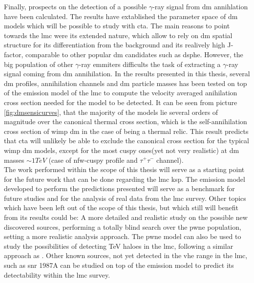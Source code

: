 \documentclass[main.tex]{subfiles}
\begin{document}
Finally, prospects on the detection of a possible $\gamma$-ray signal from \gls{dm} annihlation have been calculated. The results have extablished the parameter space of \gls{dm} models which will be possible to study with \gls{cta}. The main reasons to point towards the \gls{lmc} were its extended nature, which allow to rely on \gls{dm} spatial structure for its differentiation from the background and its realively high J-factor, comparable to other popular \gls{dm} candidates such as \gls{dsphe}. However, the big population of other $\gamma$-ray emmiters difficults the task of extracting a $\gamma$-ray signal coming from \gls{dm} annihilation. In the results presented in this thesis, several \gls{dm} profiles, annihilation channels and \gls{dm} particle masses has been tested on top of the emission model of the \gls{lmc} to compute the velocity averaged anihilation cross section needed for the model to be detected. It can be seen from picture \ref{fig:dmsensicurves}, that the majority of the models lie several orders of magnitude over the canonical thermal cross section, which is the self-annihilation cross section of \gls{wimp} \gls{dm} in the case of being a thermal relic. This result predicts that \gls{cta} will unlikely be able to exclude the canonical cross section for the typical \gls{wimp} \gls{dm} models, except for the most cuspy ones(yet not very realistic) at \gls{dm} masses $\sim 1 TeV$ (case of nfw-cuspy profile and $\tau^+ \tau^-$ channel).\\

The work performed within the scope of this thesis will serve as a starting point for the future work that can be done regarding the \gls{lmc} \gls{ksp}. The emission model developed to perform the predictions presented will serve as a benchmark for future studies and for the analysis of real data from the \gls{lmc} survey.
Other topics which have been left out of the scope of this thesis, but which still will benefit from its results could be: A more detailed and realistic study on the possible new discovered sources, performing a totally blind search over the \gls{pwne} population, setting a more realistic analysis approach. The \gls{pwne} model can also be used to study the possibilities of detecting TeV haloes in the \gls{lmc}, following a similar approach as \cite{2019tevhalos}. 
Other known sources, not yet detected in the \gls{vhe} range in the \gls{lmc}, such as \gls{snr} 1987A can be studied on top of the emission model to predict its detectability within the \gls{lmc} survey.
\end{document}
